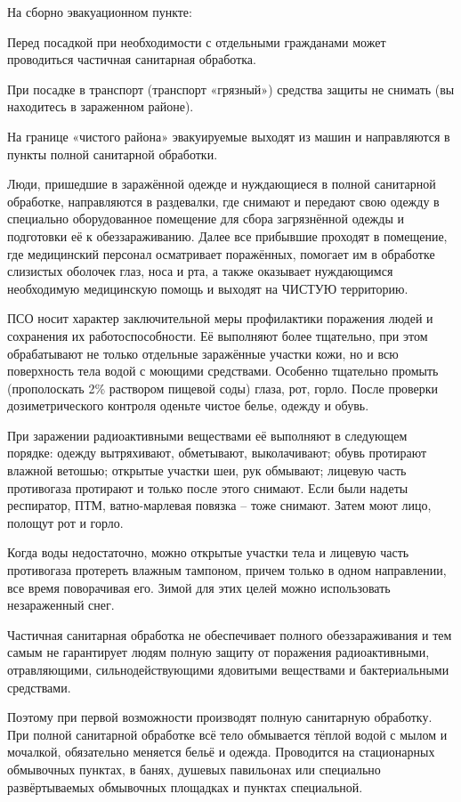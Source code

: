 \documentclass[a4paper, 12pt]{article}
\theoremstyle{definition}
\begin{document}
        На сборно эвакуационном пункте:

        Перед посадкой при необходимости с отдельными гражданами может проводиться частичная санитарная обработка.

        При посадке в транспорт (транспорт «грязный») средства защиты не снимать (вы находитесь в зараженном районе). 

        На границе «чистого района» эвакуируемые выходят из машин и направляются в пункты полной санитарной обработки.

        Люди, пришедшие в заражённой одежде и нуждающиеся в полной санитарной обработке, направляются в раздевалки,
        где снимают и передают свою одежду в специально оборудованное помещение для сбора загрязнённой одежды и подготовки её к обеззараживанию. Далее все прибывшие проходят в помещение, где медицинский персонал осматривает поражённых, помогает им в обработке слизистых оболочек глаз, носа и рта, а также оказывает нуждающимся необходимую медицинскую помощь и выходят на ЧИСТУЮ территорию.

        ПСО  носит характер заключительной меры профилактики поражения людей и сохранения их работоспособности. Её выполняют более тщательно, при этом обрабатывают не только отдельные заражённые участки кожи, но и всю поверхность тела водой с моющими средствами. Особенно тщательно промыть (прополоскать 2\% раствором пищевой соды) глаза, рот, горло.  После проверки дозиметрического контроля оденьте чистое белье, одежду и обувь.

        При заражении радиоактивными веществами её выполняют в следующем порядке: одежду вытряхивают, обметывают, выколачивают; обувь протирают влажной ветошью; открытые участки шеи, рук обмывают; лицевую часть противогаза протирают и только после этого снимают. Если были надеты респиратор, ПТМ, ватно-марлевая повязка – тоже снимают. Затем моют лицо, полощут рот и горло.

        Когда воды недостаточно, можно открытые участки тела и лицевую часть противогаза протереть влажным тампоном, причем только в одном направлении, все время поворачивая его. Зимой для этих целей можно использовать незараженный снег. 

        Частичная санитарная обработка не обеспечивает полного обеззараживания и тем самым не гарантирует людям полную защиту от поражения радиоактивными, отравляющими, сильнодействующими ядовитыми веществами и бактериальными средствами. 

        Поэтому при первой возможности производят полную санитарную обработку. При полной санитарной обработке всё тело обмывается тёплой водой с мылом и мочалкой, обязательно меняется бельё и одежда. Проводится на стационарных обмывочных пунктах, в банях, душевых павильонах или специально развёртываемых обмывочных площадках и пунктах специальной.
\end{document}
